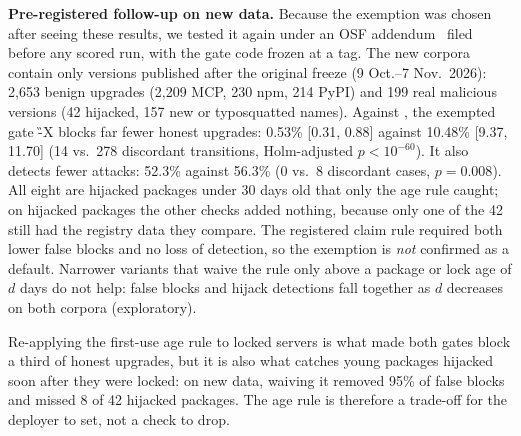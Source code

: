
\textbf{Pre-registered follow-up on new data.} Because the exemption was chosen after seeing these results, we tested it
again under an OSF addendum~\cite{osf2026prereg} filed before any scored run, with the gate code frozen at a tag. The
new corpora contain only versions published after the original freeze (9 Oct.--7 Nov.\ 2026): 2,653 benign upgrades
(2,209 MCP, 230 npm, 214 PyPI) and 199 real malicious versions (42 hijacked, 157 new or typosquatted names). Against
\SC, the exempted gate \G-X blocks far fewer honest upgrades: 0.53\% [0.31, 0.88] against 10.48\% [9.37, 11.70] (14 vs.\
278 discordant transitions, Holm-adjusted $p < 10^{-60}$). It also detects fewer attacks: 52.3\% against 56.3\% (0 vs.\
8 discordant cases, $p = 0.008$). All eight are hijacked packages under 30 days old that only the age rule caught; on
hijacked packages the other checks added nothing, because only one of the 42 still had the registry data they compare.
The registered claim rule required both lower false blocks and no loss of detection, so the exemption is
\emph{not} confirmed as a default. Narrower variants that waive the rule only above a package or lock age of $d$ days do
not help: false blocks and hijack detections fall together as $d$ decreases on both corpora (exploratory).

Re-applying the first-use age rule to locked servers is what made both gates block a third of honest upgrades, but it is
also what catches young packages hijacked soon after they were locked: on new data, waiving it removed 95\% of false
blocks and missed 8 of 42 hijacked packages. The age rule is therefore a trade-off for the deployer to set, not a check
to drop.

